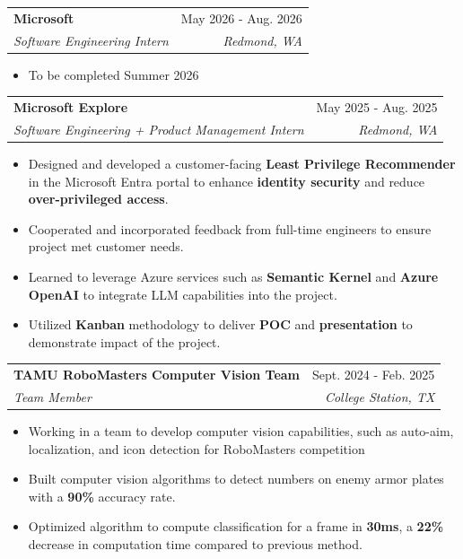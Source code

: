 \documentclass[letterpaper,10pt]{article}
\makeatletter
\newcommand{\resumeItem}[1]{
  \item\small{
    {#1 \vspace{-2pt}}
  }
}
\newcommand{\resumeSubheading}[4]{
  \vspace{-2pt}\item
    \begin{tabular*}{0.97\textwidth}[t]{l@{\extracolsep{\fill}}r}
      \textbf{#1} & #2 \\
      \textit{\small#3} & \textit{\small #4} \\
    \end{tabular*}\vspace{-7pt}
}
\newcommand{\resumeItemListStart}{\begin{itemize}}
\newcommand{\resumeItemListEnd}{\end{itemize}\vspace{-5pt}}
\makeatother
\begin{document}
  \resumeSubheading
      {Microsoft}{May 2026 - Aug. 2026}
      {Software Engineering Intern}{Redmond, WA}
      \resumeItemListStart
        \resumeItem{To be completed Summer 2026}
      \resumeItemListEnd

  \resumeSubheading
      {Microsoft Explore}{May 2025 - Aug. 2025}
      {Software Engineering + Product Management Intern}{Redmond, WA}
      \resumeItemListStart
        \resumeItem{Designed and developed a customer-facing \textbf{Least Privilege Recommender} in the Microsoft Entra portal to enhance \textbf{identity security} and reduce \textbf{over-privileged access}.}
        \resumeItem{Cooperated and incorporated feedback from full-time engineers to ensure project met customer needs.}
        \resumeItem{Learned to leverage Azure services such as \textbf{Semantic Kernel} and \textbf{Azure OpenAI} to integrate LLM capabilities into the project.}
        \resumeItem{Utilized \textbf{Kanban} methodology to deliver \textbf{POC} and \textbf{presentation} to demonstrate impact of the project.}
      \resumeItemListEnd

  \resumeSubheading
      {TAMU RoboMasters Computer Vision Team}{Sept. 2024 - Feb. 2025}
      {Team Member}{College Station, TX}
      \resumeItemListStart
        \resumeItem{Working in a team to develop computer vision capabilities, such as auto-aim, localization, and icon detection for RoboMasters competition}
        \resumeItem{Built computer vision algorithms to detect numbers on enemy armor plates with a \textbf{90\%} accuracy rate.}
        \resumeItem{Optimized algorithm to compute classification for a frame in \textbf{30ms}, a \textbf{22\%} decrease in computation time compared to previous method.}
      \resumeItemListEnd



\end{document}
